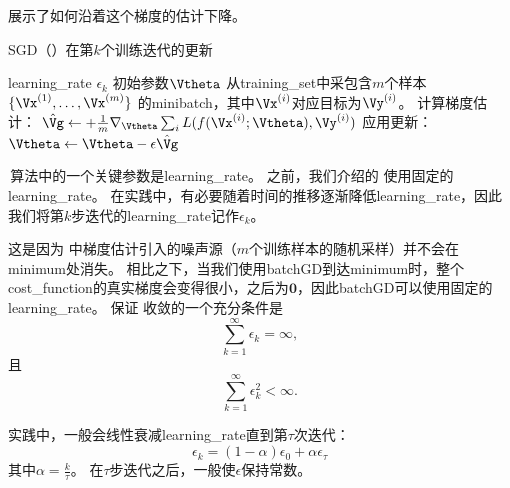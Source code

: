 
展示了如何沿着这个梯度的估计下降。



\begin{algorithm}[ht]
\caption{\gls{SGD}（）在第$k$个训练迭代的更新}
\label{alg:sgd}
\begin{algorithmic}
\REQUIRE \gls{learning_rate} $\epsilon_k$
\REQUIRE 初始参数$\Vtheta$
    \STATE 从\gls{training_set}中采包含$m$个样本$\{ \Vx^{(1)},\dots, \Vx^{(m)}\}$ 的\gls{minibatch}，其中$\Vx^{(i)}$对应目标为$\Vy^{(i)}$。
    \STATE 计算梯度估计： $\hat{\Vg} \leftarrow + 
         \frac{1}{m} \nabla_{\Vtheta} \sum_i L(f(\Vx^{(i)};\Vtheta),\Vy^{(i)})$
    \STATE 应用更新：$\Vtheta \leftarrow \Vtheta - \epsilon \hat{\Vg}$
\ENDWHILE
\end{algorithmic}
\end{algorithm}



\,算法中的一个关键参数是\gls{learning_rate}。
之前，我们介绍的\,\,使用固定的\gls{learning_rate}。
在实践中，有必要随着时间的推移逐渐降低\gls{learning_rate}，因此我们将第$k$步迭代的\gls{learning_rate}记作$\epsilon_k$。


这是因为\,\,中梯度估计引入的噪声源（$m$个训练样本的随机采样）并不会在\gls{minimum}处消失。
相比之下，当我们使用\gls{batch}\gls{GD}到达\gls{minimum}时，整个\gls{cost_function}的真实梯度会变得很小，之后为$\mathbf{0}$，因此\gls{batch}\gls{GD}可以使用固定的\gls{learning_rate}。
保证\,\,收敛的一个充分条件是
\begin{equation}
\label{eq:8.12}
    \sum_{k=1}^\infty \epsilon_k = \infty,
\end{equation}
且
\begin{equation}
\label{eq:8.13}
    \sum_{k=1}^\infty \epsilon_k^2 < \infty.
\end{equation}


实践中，一般会线性衰减\gls{learning_rate}直到第$\tau$次迭代：
\begin{equation}
\label{eq:8.14}
    \epsilon_k = (1-\alpha) \epsilon_0 + \alpha \epsilon_\tau
\end{equation}
其中$\alpha = \frac{k}{\tau}$。
在$\tau$步迭代之后，一般使$\epsilon$保持常数。

